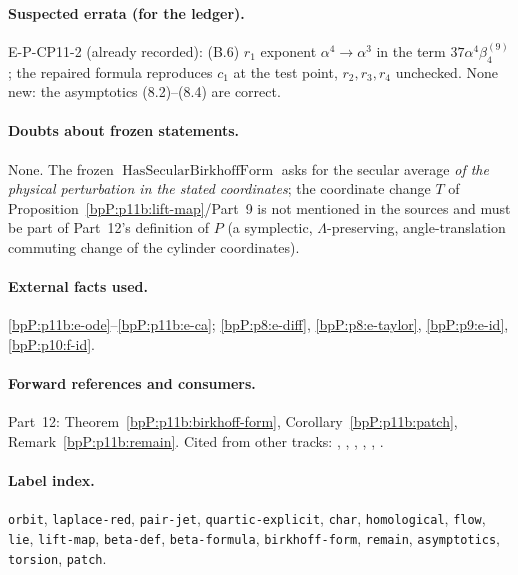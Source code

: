 \paragraph{Suspected errata (for the ledger).} E-P-CP11-2 (already recorded): (B.6) $r_1$ exponent $\alpha^4\to\alpha^3$ in the term $37\alpha^4\beta_4^{(9)}$; the repaired formula reproduces $c_1$ at the test point, $r_2,r_3,r_4$ unchecked. None new: the asymptotics (8.2)--(8.4) are correct.

\paragraph{Doubts about frozen statements.} None. The frozen $\operatorname{HasSecularBirkhoffForm}$ asks for the secular average \emph{of the physical perturbation in the stated coordinates}; the coordinate change $T$ of Proposition~\ref{bpP:p11b:lift-map}/Part~9 is not mentioned in the sources and must be part of Part~12's definition of $P$ (a symplectic, $\Lambda$-preserving, angle-translation commuting change of the cylinder coordinates).

\paragraph{External facts used.} \ref{bpP:p11b:e-ode}--\ref{bpP:p11b:e-ca}; \ref{bpP:p8:e-diff}, \ref{bpP:p8:e-taylor}, \ref{bpP:p9:e-id}, \ref{bpP:p10:f-id}.

\paragraph{Forward references and consumers.} Part~12: Theorem~\ref{bpP:p11b:birkhoff-form}, Corollary~\ref{bpP:p11b:patch}, Remark~\ref{bpP:p11b:remain}. Cited from other tracks: , , , , , .

\paragraph{Label index.} \texttt{orbit}, \texttt{laplace-red}, \texttt{pair-jet}, \texttt{quartic-explicit}, \texttt{char}, \texttt{homological}, \texttt{flow}, \texttt{lie}, \texttt{lift-map}, \texttt{beta-def}, \texttt{beta-formula}, \texttt{birkhoff-form}, \texttt{remain}, \texttt{asymptotics}, \texttt{torsion}, \texttt{patch}.
\par\endgroup

